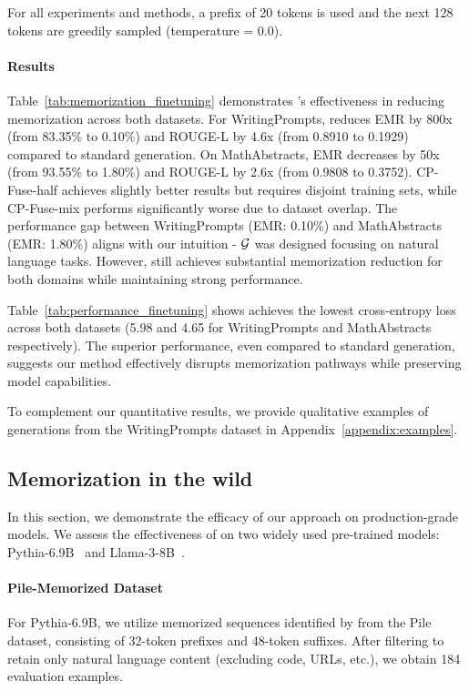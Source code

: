 For all experiments and methods, a prefix of 20 tokens is used and the next 128 tokens are greedily sampled (temperature = 0.0).

\paragraph{Results}
Table~\ref{tab:memorization_finetuning} demonstrates \sys's effectiveness in reducing memorization across both datasets. For WritingPrompts, \sys reduces EMR by 800x (from 83.35\% to 0.10\%) and ROUGE-L by 4.6x (from 0.8910 to 0.1929) compared to standard generation. On MathAbstracts, EMR decreases by 50x (from 93.55\% to 1.80\%) and ROUGE-L by 2.6x (from 0.9808 to 0.3752). CP-Fuse-half achieves slightly better results but requires disjoint training sets, while CP-Fuse-mix performs significantly worse due to dataset overlap. The performance gap between WritingPrompts (EMR: 0.10\%) and MathAbstracts (EMR: 1.80\%) aligns with our intuition - \(\mathcal{G}\) was designed focusing on natural language tasks. However, \sys still achieves substantial memorization reduction for both domains while maintaining strong performance.

Table~\ref{tab:performance_finetuning} shows \sys achieves the lowest cross-entropy loss across both datasets (5.98 and 4.65 for WritingPrompts and MathAbstracts respectively). The superior performance, even compared to standard generation, suggests our method effectively disrupts memorization pathways while preserving model capabilities. 

To complement our quantitative results, we provide qualitative examples of generations from the WritingPrompts dataset in Appendix~\ref{appendix:examples}.

\subsection{Memorization in the wild}
\label{subsection:wild}
In this section, we demonstrate the efficacy of our approach on production-grade models. We assess the effectiveness of \sys on two widely used pre-trained models: Pythia-6.9B~\citep{biderman2023pythiasuiteanalyzinglarge} and Llama-3-8B~\citep{dubey2024llama}. 

\paragraph{Pile-Memorized Dataset} For Pythia-6.9B, we utilize memorized sequences identified by \citet{chang2024localization} from the Pile dataset, consisting of 32-token prefixes and 48-token suffixes. After filtering to retain only natural language content (excluding code, URLs, etc.), we obtain 184 evaluation examples.

